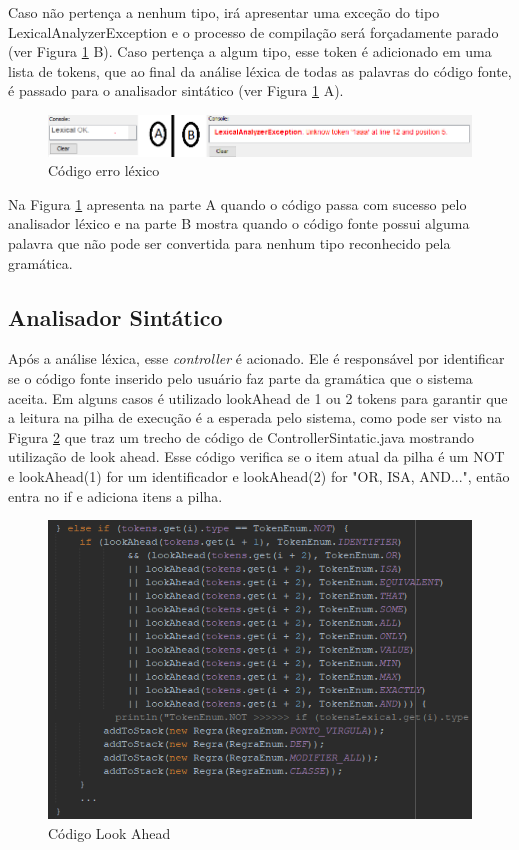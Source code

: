 \documentclass{bcc}
\begin{document}
Caso não pertença a nenhum tipo, irá apresentar uma exceção do tipo LexicalAnalyzerException e o processo de compilação será forçadamente parado (ver Figura \ref{fig:codigoErroLexico} B). Caso pertença a algum tipo, esse token é adicionado em uma lista de tokens, que ao final da análise léxica de todas as palavras do código fonte, é passado para o analisador sintático (ver Figura \ref{fig:codigoErroLexico} A).

\begin{figure}[H]
\centering
\includegraphics[width=.7\textwidth]{Figuras/codigo_erro_lexico.png}
\caption{Código erro léxico}
\label{fig:codigoErroLexico}
\end{figure}

Na Figura \ref{fig:codigoErroLexico} apresenta na parte A quando o código passa com sucesso pelo analisador léxico e na parte B mostra quando o código fonte possui alguma palavra que não pode ser convertida para nenhum tipo reconhecido pela gramática.

\subsection{Analisador Sintático}

Após a análise léxica, esse \textit{controller} é acionado. Ele é responsável por identificar se o código fonte inserido pelo usuário faz parte da gramática que o sistema aceita. Em alguns casos é utilizado lookAhead de 1 ou 2 tokens para garantir que a leitura na pilha de execução é a esperada pelo sistema, como pode ser visto na Figura \ref{fig:codigoLookAhead} que traz um trecho de código de ControllerSintatic.java mostrando utilização de look ahead. Esse código verifica se o item atual da pilha é um NOT e lookAhead(1) for um identificador e lookAhead(2) for "OR, ISA, AND...", então entra no if e adiciona itens a pilha.

\begin{figure}[H]
\centering
\includegraphics[width=.8\textwidth]{Figuras/codigo_lookahead.png}
\caption{Código Look Ahead}
\label{fig:codigoLookAhead}
\end{figure}
\end{document}
